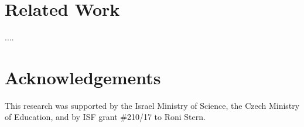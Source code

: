 \documentclass[letterpaper]{article} %
\begin{document}


\section{Related Work}
....




\section{Acknowledgements}
This research was supported by the Israel Ministry of Science, the Czech Ministry of Education, and by ISF grant \#210/17 to Roni Stern.



\end{document}
